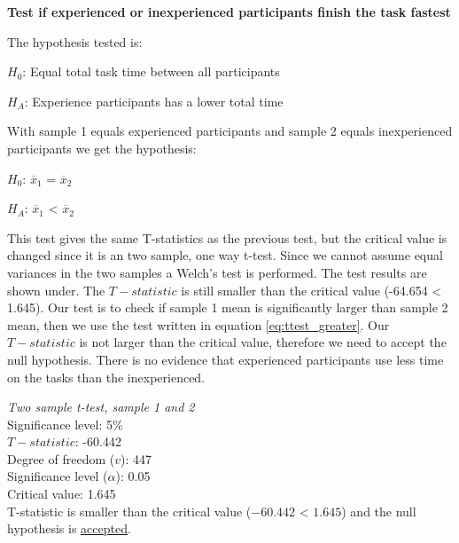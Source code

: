 \vspace{0.7cm}

\textbf{Test if  experienced or inexperienced participants finish the task fastest} 

The hypothesis tested is:\newline

\centerline{$H_{0}$: Equal total task time between all participants}
\centerline{$H_{A}$: Experience participants has a lower total time}

With sample 1 equals experienced participants and sample 2 equals inexperienced participants we get the hypothesis:\\[0.2cm]

\centerline{$H_{0}$: $\overline{x}_1$ = $\overline{x}_2$}
\centerline{$H_{A}$: $\overline{x}_1$ < $\overline{x}_2$}

This test gives the same T-statistics as the previous test, but the critical value is changed since it is an two sample, one way t-test. Since we cannot assume equal variances in the two samples a Welch's test is performed. The test results are shown under. The $T-statistic$ is still smaller than the critical value (-64.654 < 1.645). Our test is to check if sample 1 mean is significantly larger than sample 2 mean, then we use the test written in equation \ref{eq:ttest_greater}. Our $T-statistic$ is not larger than the critical value, therefore we need to accept the null hypothesis. There is no evidence that experienced participants use less time on the tasks than the inexperienced. 

 \begin{center}
	\begin{tcolorbox}[box align=center,width=\textwidth-5cm]
		\centering
		\textit{Two sample t-test, sample 1 and 2}\\
		Significance level: 5\%  \\[0.5cm]
		
		$T-statistic$: -60.442 \\
		Degree of freedom ($v$): 447 \\ %
		Significance level ($\alpha$): 0.05 \\
		Critical value: 1.645\\[0.2cm]
		
		T-statistic is smaller than the critical value ($-60.442$ < $1.645$) and the null hypothesis is \underline{accepted}.\\[0.5cm]
	\end{tcolorbox} 
\end{center}

